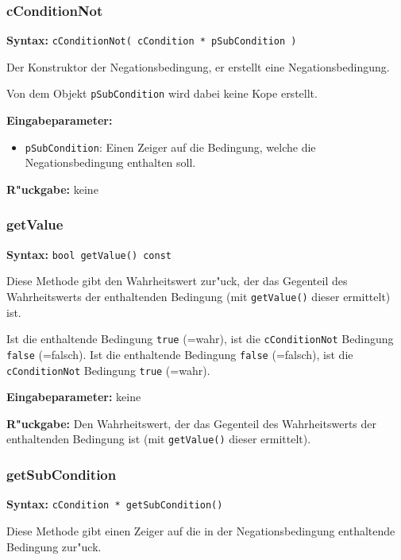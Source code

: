 \subsubsection{cConditionNot}

\bigskip\noindent
\textbf{Syntax:} \verb|cConditionNot( cCondition * pSubCondition )|

\bigskip\noindent
Der Konstruktor der Negationsbedingung, er erstellt eine Negationsbedingung.

Von dem Objekt \verb|pSubCondition| wird dabei keine Kope erstellt.

\bigskip\noindent
\textbf{Eingabeparameter:}
\begin{itemize}
 \item \verb|pSubCondition|: Einen Zeiger auf die Bedingung, welche die Negationsbedingung enthalten soll.
\end{itemize}

\bigskip\noindent
\textbf{R"uckgabe:} keine


\subsubsection{getValue}

\textbf{Syntax:} \verb|bool getValue() const|

\bigskip\noindent
Diese Methode gibt den Wahrheitswert zur"uck, der das Gegenteil des Wahrheitswerts der enthaltenden Bedingung (mit \verb|getValue()| dieser ermittelt) ist.

Ist die enthaltende Bedingung \verb|true| (=wahr), ist die \verb|cConditionNot| Bedingung \verb|false| (=falsch). Ist die enthaltende Bedingung \verb|false| (=falsch), ist die \verb|cConditionNot| Bedingung \verb|true| (=wahr).

\bigskip\noindent
\textbf{Eingabeparameter:} keine

\bigskip\noindent
\textbf{R"uckgabe:} Den Wahrheitswert, der das Gegenteil des Wahrheitswerts der enthaltenden Bedingung ist (mit \verb|getValue()| dieser ermittelt).


\subsubsection{getSubCondition}

\textbf{Syntax:} \verb|cCondition * getSubCondition()|

\bigskip\noindent
Diese Methode gibt einen Zeiger auf die in der Negationsbedingung enthaltende Bedingung zur"uck.

